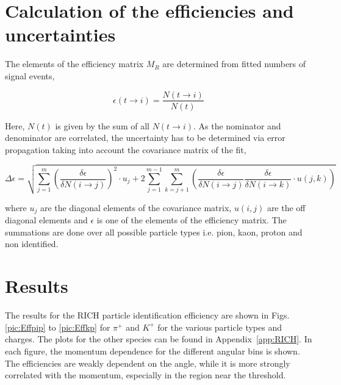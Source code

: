 \section{Calculation of the efficiencies and uncertainties}

The elements of the efficiency matrix $M_R$ are determined from fitted numbers of signal events,

\begin{equation}
  \epsilon(t\rightarrow i) = \frac{N(t\rightarrow i)}{N(t)}
\end{equation}

Here, $N(t)$ is given by the sum of all $N(t \rightarrow i)$. As the nominator and denominator are correlated, the uncertainty has to be determined via error propagation taking into account the covariance matrix of the fit,

\begin{equation}
  \Delta \epsilon = \sqrt{\sum_{j=1}^m \left( \frac{\delta \epsilon}{\delta N(i\rightarrow j)} \right)^2 \cdot u_j + 2 \sum_{j=1}^{m-1} \sum_{k=j+1}^{m} \left( \frac{\delta \epsilon}{\delta N(i\rightarrow j)} \frac{\delta \epsilon}{\delta N(i\rightarrow k)} \cdot u(j,k) \right)}
\end{equation}

where $u_j$ are the diagonal elements of the covariance matrix, $u(i,j)$ are the off diagonal elements and $\epsilon$ is one of the elements of the efficiency matrix. The summations are done over all possible particle types i.e. pion, kaon, proton and non identified.

\section{Results} \label{sec:Results}

The results for the RICH particle identification efficiency are shown in Figs. \ref{pic:Effpip} to \ref{pic:Effkp} for $\pi^+$ and $K^+$ for the various particle types and charges. The plots for the other species can be found in Appendix~\ref{app:RICH}. In each figure, the momentum dependence for the different angular bins is shown. The efficiencies are weakly dependent on the angle, while it is more strongly correlated with the momentum, especially in the region near the threshold.


